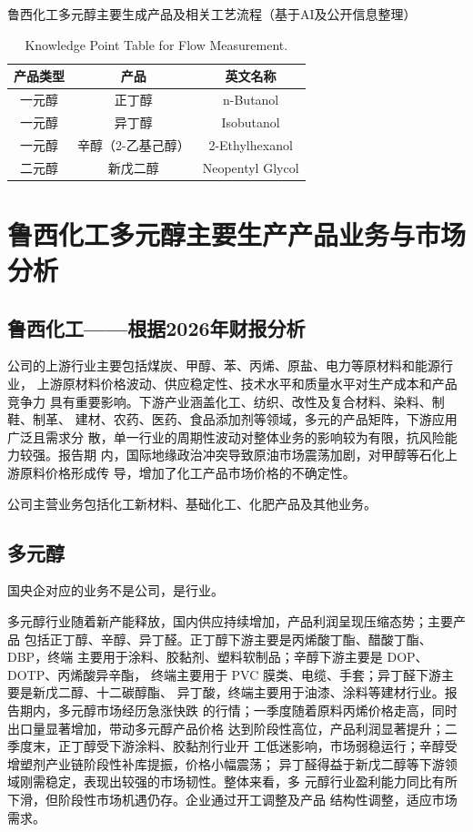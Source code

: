 \documentclass{book}
\begin{document}
\tableofcontents
\clearpage

鲁西化工多元醇主要生成产品及相关工艺流程（基于AI及公开信息整理）

\begin{table}[htbp]
\centering
\begin{tabular}{c c c} 
\toprule
产品类型 & 产品 & 英文名称\\ [0.5ex] 
\midrule
一元醇 & 正丁醇 & 	n-Butanol\\
一元醇 & 异丁醇 & 	Isobutanol\\
一元醇 & 辛醇（2-乙基己醇） & 2-Ethylhexanol\\
二元醇 & 新戊二醇 & 	Neopentyl Glycol\\
\end{tabular}
\caption{Knowledge Point Table for Flow Measurement.}
\label{table:pipeline-knowledge}
\end{table}

\chapter{鲁西化工多元醇主要生产产品业务与市场分析}

\section{鲁西化工——根据2026年财报分析}

公司的上游行业主要包括煤炭、甲醇、苯、丙烯、原盐、电力等原材料和能源行业，
上游原材料价格波动、供应稳定性、技术水平和质量水平对生产成本和产品竞争力
具有重要影响。下游产业涵盖化工、纺织、改性及复合材料、染料、制鞋、制革、
建材、农药、医药、食品添加剂等领域，多元的产品矩阵，下游应用广泛且需求分
散，单一行业的周期性波动对整体业务的影响较为有限，抗风险能力较强。报告期
内，国际地缘政治冲突导致原油市场震荡加剧，对甲醇等石化上游原料价格形成传
导，增加了化工产品市场价格的不确定性。

公司主营业务包括化工新材料、基础化工、化肥产品及其他业务。

\section{多元醇}

国央企对应的业务不是公司，是行业。

多元醇行业随着新产能释放，国内供应持续增加，产品利润呈现压缩态势；主要产品
包括正丁醇、辛醇、异丁醛。正丁醇下游主要是丙烯酸丁酯、醋酸丁酯、DBP，终端
主要用于涂料、胶黏剂、塑料软制品；辛醇下游主要是 DOP、DOTP、丙烯酸异辛酯，
终端主要用于 PVC 膜类、电缆、手套；异丁醛下游主要是新戊二醇、十二碳醇酯、
异丁酸，终端主要用于油漆、涂料等建材行业。报告期内，多元醇市场经历急涨快跌
的行情；一季度随着原料丙烯价格走高，同时出口量显著增加，带动多元醇产品价格
达到阶段性高位，产品利润显著提升；二季度末，正丁醇受下游涂料、胶黏剂行业开
工低迷影响，市场弱稳运行；辛醇受增塑剂产业链阶段性补库提振，价格小幅震荡；
异丁醛得益于新戊二醇等下游领域刚需稳定，表现出较强的市场韧性。整体来看，多
元醇行业盈利能力同比有所下滑，但阶段性市场机遇仍存。企业通过开工调整及产品
结构性调整，适应市场需求。
\end{document}
